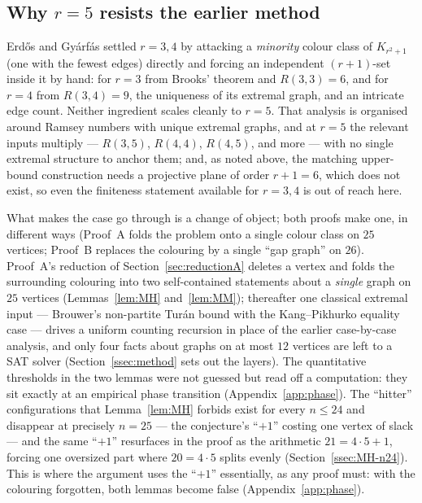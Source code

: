 \documentclass[11pt,reqno]{amsart}
\theoremstyle{definition}
\theoremstyle{remark}
\begin{document}
\subsection{Why \texorpdfstring{$r=5$}{r=5} resists the earlier method}\label{ssec:why}
Erd\H{o}s and Gy\'arf\'as settled $r=3,4$ by attacking a \emph{minority} colour
class of $K_{r^2+1}$ (one with the fewest edges) directly and forcing an
independent $(r+1)$-set inside it by hand: for $r=3$ from Brooks' theorem and
$R(3,3)=6$, and for $r=4$ from $R(3,4)=9$, the uniqueness of its extremal graph,
and an intricate edge count. Neither ingredient scales cleanly to $r=5$. That
analysis is organised around Ramsey numbers with unique extremal graphs, and at
$r=5$ the relevant inputs multiply --- $R(3,5)$, $R(4,4)$, $R(4,5)$, and more ---
with no single extremal structure to anchor them; and, as noted above, the
matching upper-bound construction needs a projective plane of order $r+1=6$, which
does not exist, so even the finiteness statement available for $r=3,4$ is out of
reach here.

What makes the case go through is a change of object; both proofs make one, in
different ways (Proof~A folds the problem onto a single colour class on $25$ vertices;
Proof~B replaces the colouring by a single ``gap graph'' on $26$). Proof~A's reduction
of Section~\ref{sec:reductionA} deletes a vertex and folds the surrounding colouring
into two self-contained statements about a \emph{single} graph on $25$ vertices
(Lemmas~\ref{lem:MH} and~\ref{lem:MM}); thereafter one classical extremal input ---
Brouwer's non-partite Tur\'an bound with the Kang--Pikhurko equality case ---
drives a uniform counting recursion in place of the earlier case-by-case analysis,
and only four facts about graphs on at most $12$ vertices are left to a SAT solver
(Section~\ref{ssec:method} sets out the layers). The quantitative thresholds in the
two lemmas were not guessed but read off a computation: they sit exactly at an
empirical phase transition (Appendix~\ref{app:phase}). The ``hitter'' configurations
that Lemma~\ref{lem:MH} forbids exist for every $n\le 24$ and disappear at precisely
$n=25$ --- the conjecture's ``$+1$'' costing one vertex of slack --- and the same
``$+1$'' resurfaces in the proof as the arithmetic $21=4\cdot 5+1$, forcing one
oversized part where $20=4\cdot 5$ splits evenly (Section~\ref{ssec:MH-n24}). This
is where the argument uses the ``$+1$'' essentially, as any proof must: with the
colouring forgotten, both lemmas become false (Appendix~\ref{app:phase}).
\end{document}
